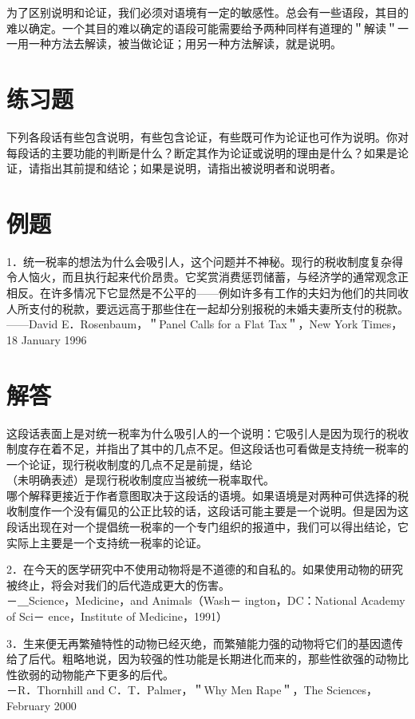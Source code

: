 为了区别说明和论证，我们必须对语境有一定的敏感性。总会有一些语段，其目的难以确定。一个其目的难以确定的语段可能需要给予两种同样有道理的＂解读＂一一用一种方法去解读，被当做论证；用另一种方法解读，就是说明。

\section*{练习题}
下列各段话有些包含说明，有些包含论证，有些既可作为论证也可作为说明。你对每段话的主要功能的判断是什么？断定其作为论证或说明的理由是什么？如果是论证，请指出其前提和结论；如果是说明，请指出被说明者和说明者。

\section*{例题}
1．统一税率的想法为什么会吸引人，这个问题并不神秘。现行的税收制度复杂得令人恼火，而且执行起来代价昂贵。它奖赏消费惩罚储蓄，与经济学的通常观念正相反。在许多情况下它显然是不公平的——例如许多有工作的夫妇为他们的共同收人所支付的税款，要远远高于那些住在一起却分别报税的未婚夫妻所支付的税款。\\
——David E．Rosenbaum，＂Panel Calls for a Flat Tax＂，New York Times， 18 January 1996

\section*{解答}
这段话表面上是对统一税率为什么吸引人的一个说明：它吸引人是因为现行的税收制度存在着不足，并指出了其中的几点不足。但这段话也可看做是支持统一税率的一个论证，现行税收制度的几点不足是前提，结论\\
（未明确表述）是现行税收制度应当被统一税率取代。\\
哪个解释更接近于作者意图取决于这段话的语境。如果语境是对两种可供选择的税收制度作一个没有偏见的公正比较的话，这段话可能主要是一个说明。但是因为这段话出现在对一个提倡统一税率的一个专门组织的报道中，我们可以得出结论，它实际上主要是一个支持统一税率的论证。

2．在今天的医学研究中不使用动物将是不道德的和自私的。如果使用动物的研究被终止，将会对我们的后代造成更大的伤害。\\
－＿Science，Medicine，and Animals（Wash－ ington，DC：National Academy of Sci－ ence，Institute of Medicine，1991）

3．生来便无再繁殖特性的动物已经灭绝，而繁殖能力强的动物将它们的基因遗传给了后代。粗略地说，因为较强的性功能是长期进化而来的，那些性欲强的动物比性欲弱的动物能产下更多的后代。\\
－R．Thornhill and C．T．Palmer，＂Why Men Rape＂，The Sciences，February 2000

